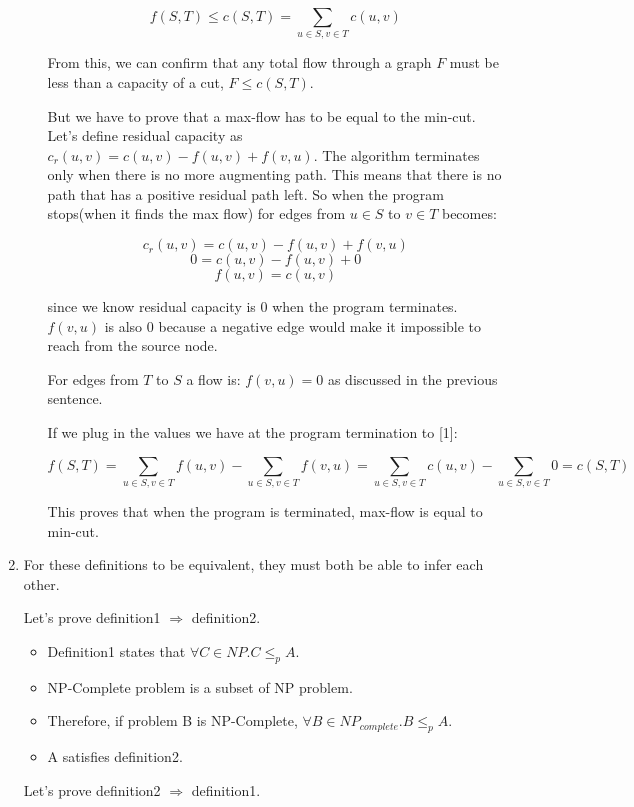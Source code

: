 \documentclass{article}
\begin{document}
\begin{enumerate}
\begin{enumerate}
        \[f(S,T)\leq c(S,T)=\sum_{u\in S,v\in T}c(u,v)\]

        From this, we can confirm that any total flow through a graph $F$ must be less than a capacity of a cut, $F\leq c(S,T)$.

        But we have to prove that a max-flow has to be equal to the min-cut.
        Let's define residual capacity as $c_r(u,v)=c(u,v)-f(u,v)+f(v,u)$.
        The algorithm terminates only when there is no more augmenting path.
        This means that there is no path that has a positive residual path left.
        So when the program stops(when it finds the max flow) for edges from $u\in S$ to $v\in T$ becomes:

        \[c_r(u,v)=c(u,v)-f(u,v)+f(v,u)\]
        \[0=c(u,v)-f(u,v)+0\]
        \[f(u,v)=c(u,v)\]

        since we know residual capacity is $0$ when the program terminates.
        $f(v,u)$ is also $0$ because a negative edge would make it impossible to reach from the source node.

        For edges from $T$ to $S$ a flow is: $f(v,u)=0$ as discussed in the previous sentence.

        If we plug in the values we have at the program termination to [1]:

        \[f(S,T)=\sum_{u\in S,v\in T}f(u,v)-\sum_{u\in S,v\in T}f(v,u)=\sum_{u\in S,v\in T}c(u,v)-\sum_{u\in S,v\in T}0=c(S,T)\]

        This proves that when the program is terminated, max-flow is equal to min-cut.

    \end{enumerate}

    \item For these definitions to be equivalent, they must both be able to infer each other.

    Let's prove definition1 $\Rightarrow$ definition2.
    
    \begin{itemize}
        \item Definition1 states that $\forall C\in NP.C\leq_pA$.
        \item NP-Complete problem is a subset of NP problem.
        \item Therefore, if problem B is NP-Complete, $\forall B\in NP_{complete}.B\leq_pA$.
        \item A satisfies definition2.
    \end{itemize}

    Let's prove definition2 $\Rightarrow$ definition1.
    

\end{enumerate}
\end{document}
